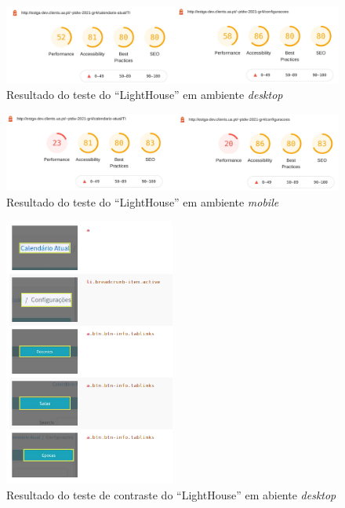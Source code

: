 \documentclass[11pt, twoside]{report}
\begin{document}
	
	 \begin{figure}[H] 
	 	\centering 							\includegraphics[width=1\textwidth,height=1\textheight,keepaspectratio]{image/acessibilityTests/Desktop}
	 	\caption{Resultado do teste do ``LightHouse'' em ambiente \textit{desktop}}
	 	\label{testDesktop}
	 \end{figure}
 
	
	\begin{figure}[H] 
		\centering 							\includegraphics[width=1\textwidth,height=1\textheight,keepaspectratio]{image/acessibilityTests/mobile}
		\caption{Resultado do teste do ``LightHouse'' em ambiente \textit{mobile}}
		\label{testMobile}
	\end{figure}
	

		 
		 \begin{figure}[H] 
		 	\centering 							\includegraphics[width=0.5\textwidth,height=0.5\textheight,keepaspectratio]{image/acessibilityTests/contrast}
		 	\caption{Resultado do teste de contraste do ``LightHouse'' em abiente \textit{desktop}}
		 	\label{testContrast}
		 \end{figure}
	
\end{document}
